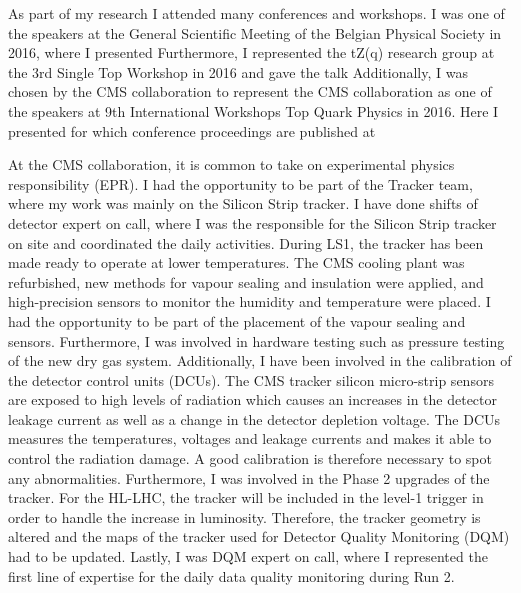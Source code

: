 \newpage\thispagestyle{empty}
As part of my research I attended many conferences and workshops. I was one of the speakers at  the General Scientific Meeting of the Belgian Physical Society in 2016, where I presented
\vspace{+2ex}
\vspace{-2ex}
Furthermore, I represented the tZ(q) research group at the 3rd Single Top Workshop in 2016 and gave the talk
\vspace{+2ex}
\vspace{-2ex}
Additionally, I was chosen by the CMS collaboration to represent the CMS collaboration as one of the speakers at 9th International Workshops Top Quark Physics in 2016. Here I presented 
\vspace{+2ex}
\vspace{-2ex}
for which conference proceedings are published at 
\vspace{+2ex}
\vspace{-2ex}


At the CMS collaboration, it is common to take on experimental physics responsibility (EPR). I had the opportunity to be part of the Tracker team, where my work was mainly on the Silicon Strip tracker. I have done shifts of detector expert on call, where I was the responsible for the Silicon Strip tracker on site and coordinated the daily activities. During LS1, the tracker has been made ready to operate at lower temperatures. The CMS cooling plant was refurbished, new methods for vapour sealing and insulation were applied, and high-precision sensors to monitor the humidity and temperature were placed. I had the opportunity to be part of the placement of the vapour sealing and sensors. Furthermore, I was involved in hardware testing such as pressure testing of the new dry gas system. Additionally, I have been involved in the calibration of the detector control units (DCUs). The CMS tracker silicon micro-strip sensors are exposed to high levels of radiation which causes an increases in the detector leakage current as well as a change in the detector depletion voltage. The DCUs measures the temperatures, voltages and leakage currents and makes it able to control the radiation damage. A good calibration is therefore necessary to spot any abnormalities. Furthermore, I was involved in the Phase 2 upgrades of the tracker. For the HL-LHC, the tracker will be included in the level-1 trigger in order to handle the increase in luminosity. Therefore, the tracker geometry is altered and the maps of the tracker used for Detector Quality Monitoring (DQM) had to be updated. Lastly, I was DQM expert on call, where I represented the first line of expertise for the daily data quality monitoring during Run 2. 

